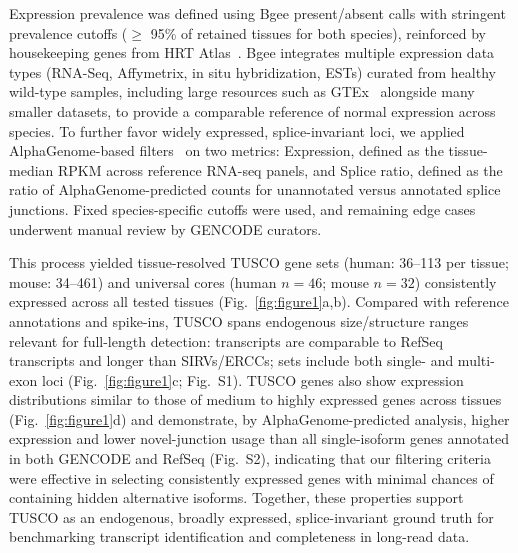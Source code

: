 \documentclass[pdflatex,sn-nature]{sn-jnl}%
\begin{document}
Expression prevalence was defined using Bgee present/absent calls with stringent prevalence cutoffs ($\geq$ 95\% of retained tissues for both species), reinforced by housekeeping genes from HRT Atlas~\cite{Bastian2021Bgee,Hounkpe2020HRT}. Bgee integrates multiple expression data types (RNA-Seq, Affymetrix, in situ hybridization, ESTs) curated from healthy wild-type samples, including large resources such as GTEx~\cite{Lonsdale2013GTEx} alongside many smaller datasets, to provide a comparable reference of normal expression across species. To further favor widely expressed, splice-invariant loci, we applied AlphaGenome-based filters~\cite{Avsec2025AlphaGenome} on two metrics: Expression, defined as the tissue-median RPKM across reference RNA-seq panels, and Splice ratio, defined as the ratio of AlphaGenome-predicted counts for unannotated versus annotated splice junctions. Fixed species-specific cutoffs were used, and remaining edge cases underwent manual review by GENCODE curators.

This process yielded tissue-resolved TUSCO gene sets (human: 36--113 per tissue; mouse: 34--461) and universal cores (human $n = 46$; mouse $n = 32$) consistently expressed across all tested tissues (Fig.~\ref{fig:figure1}a,b). Compared with reference annotations and spike-ins, TUSCO spans endogenous size/structure ranges relevant for full-length detection: transcripts are comparable to RefSeq transcripts and longer than SIRVs/ERCCs; sets include both single- and multi-exon loci (Fig.~\ref{fig:figure1}c; Fig.~S1). TUSCO genes also show expression distributions similar to those of medium to highly expressed genes across tissues (Fig.~\ref{fig:figure1}d) and demonstrate, by AlphaGenome-predicted analysis, higher expression and lower novel-junction usage than all single-isoform genes annotated in both GENCODE and RefSeq (Fig.~S2), indicating that our filtering criteria were effective in selecting consistently expressed genes with minimal chances of containing hidden alternative isoforms. Together, these properties support TUSCO as an endogenous, broadly expressed, splice-invariant ground truth for benchmarking transcript identification and completeness in long-read data.
\end{document}
